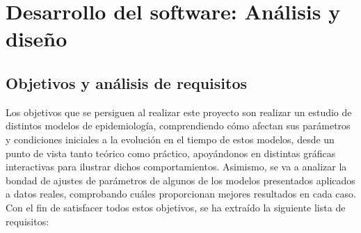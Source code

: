 
\chapter{Desarrollo del software: Análisis y diseño}

\section{Objetivos y análisis de requisitos}

Los objetivos que se persiguen al realizar este proyecto son realizar un estudio de distintos modelos de epidemiología, comprendiendo cómo afectan sus parámetros y condiciones iniciales a la evolución en el tiempo de estos modelos, desde un punto de vista tanto teórico como práctico, apoyándonos en distintas gráficas interactivas para ilustrar dichos comportamientos. Asimismo, se va a analizar la bondad de ajustes de parámetros de algunos de los modelos presentados aplicados a datos reales, comprobando cuáles proporcionan mejores resultados en cada caso. Con el fin de satisfacer todos estos objetivos, se ha extraído la siguiente lista de requisitos:

